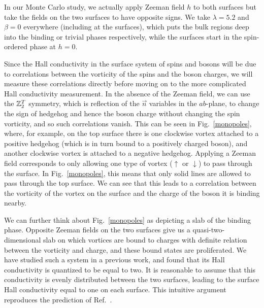 In our Monte Carlo study, we actually apply Zeeman field $h$ to both surfaces but take the fields on the two surfaces to have opposite signs.  We take $\lambda=5.2$ and $\beta=0$ everywhere (including at the surfaces), which puts the bulk regions deep into the binding or trivial phases respectively, while the surfaces start in the spin-ordered phase at $h=0$.

Since the Hall conductivity in the surface system of spins and bosons will be due to correlations between the vorticity of the spins and the boson charges,\cite{FQHE} we will measure these correlations directly before moving on to the more complicated Hall conductivity measurement. 
In the absence of the Zeeman field, we can use the $\mathbb{Z}_2^T$ symmetry, which is reflection of the $\vec n$ variables in the $ab$-plane, to change the sign of hedgehog and hence the boson charge without changing the spin vorticity, and so such correlations vanish. This can be seen in Fig.~\ref{monopoles}, where, for example, on the top surface there is one clockwise vortex attached to a positive hedgehog (which is in turn bound to a positively charged boson), and another clockwise vortex is attached to a negative hedgehog. Applying a Zeeman field corresponds to only allowing one type of vortex ($\uparrow$ or $\downarrow$) to pass through the surface. In Fig.~\ref{monopoles}, this means that only solid lines are allowed to pass through the top surface. We can see that this leads to a correlation between the vorticity of the vortex on the surface and the charge of the boson it is binding nearby. 

We can further think about Fig.~\ref{monopoles} as depicting a slab of the binding phase. Opposite Zeeman fields on the two surfaces give us a quasi-two-dimensional slab on which vortices are bound to charges with definite relation between the vorticity and charge, and these bound states are proliferated. We have studied such a system in a previous work,\cite{FQHE} and found that its Hall conductivity is quantized to be equal to two. It is reasonable to assume that this conductivity is evenly distributed between the two surfaces, leading to the surface Hall conductivity equal to one on each surface. This intuitive argument reproduces the prediction of Ref.~\cite{SenthilVishwanath}.

